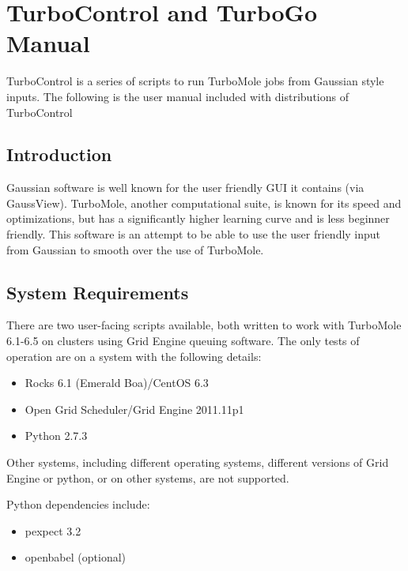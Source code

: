 \chapter{TurboControl and TurboGo Manual}\label{app.readme}


TurboControl is a series of scripts to run TurboMole jobs from Gaussian style inputs. The following is the user manual included with distributions of TurboControl 

\section{Introduction}
Gaussian software is well known for the user friendly GUI it contains (via GaussView). TurboMole, another computational suite, is known for its speed and optimizations, but has a significantly higher learning curve and is less beginner friendly. This software is an attempt to be able to use the user friendly input from Gaussian to smooth over the use of TurboMole.

\section{System Requirements}

There are two user-facing scripts available, both written to work with TurboMole 6.1-6.5 on clusters using Grid Engine queuing software. The only tests of operation are on a system with the following details:

\begin{itemize}
\itemsep1pt\parskip0pt
\item
  Rocks 6.1 (Emerald Boa)/CentOS 6.3
\item
  Open Grid Scheduler/Grid Engine 2011.11p1
\item
  Python 2.7.3
\end{itemize}

Other systems, including different operating systems, different versions of Grid Engine or python, or on other systems, are not supported.

Python dependencies include:

\begin{itemize}
\itemsep1pt\parskip0pt
\item
  pexpect 3.2\autocite{pexpect}
\item
  openbabel (optional)\autocite{openbabel, oboyle2011} 
\end{itemize}

